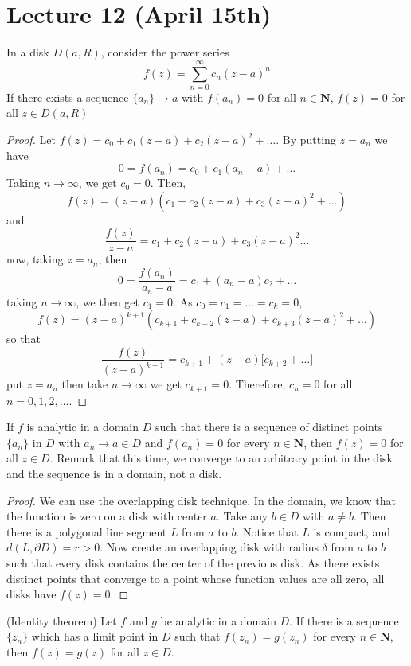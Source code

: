 \section{Lecture 12 (April 15th)}
\begin{thm}
In a disk $D(a,R)$, consider the power series 
\[f(z)=\sum ^{\infty }_{n=0}c_{n}(z-a)^{n}\]
If there exists a sequence $\{a_{n}\}\rightarrow a$ with $f(a_{n})=0$ for all $n\in {\bm N}$, $f(z)=0$ for all $z\in D(a,R)$
\end{thm}
\vspace{2ex}
\begin{proof}
Let $f(z)=c_0+c_1(z-a)+c_2(z-a)^2+\ldots $. By putting $z=a_{n}$ we have
\[0=f(a_{n})=c_0+c_1(a_{n}-a)+\ldots \]
Taking $n\rightarrow \infty $, we get $c_0=0$. Then,
\[f(z)=(z-a)(c_1+c_2(z-a)+c_3(z-a)^2+\ldots )\]
and
\[\dfrac{f(z)}{z-a}=c_1+c_2(z-a)+c_3(z-a)^2\ldots \]
now, taking $z=a_{n}$, then
\[0=\dfrac{f(a_{n})}{a_{n}-a}=c_1+(a_{n}-a)c_2+\ldots \]
taking $n\rightarrow  \infty $, we then get $c_1=0$. As $c_0=c_1=\ldots =c_{k}=0$,
\[f(z)=(z-a)^{k+1}(c_{k+1}+c_{k+2}(z-a)+c_{k+3}(z-a)^2+\ldots )\]
so that
\[\dfrac{f(z)}{(z-a)^{k+1}}=c_{k+1}+(z-a)\Big[c_{k+2}+\ldots \Big]\]
put $z=a_{n}$ then take $n\rightarrow \infty $ we get $c_{k+1}=0$. Therefore, $c_{n}=0$ for all $n=0,1,2,\ldots $.
\end{proof}
\vspace{2ex}
\begin{thm}
If $f$ is analytic in a domain $D$ such that there is a sequence of distinct points $\{a_{n}\}$ in $D$ with $a_{n}\rightarrow a\in D$ and $f(a_{n})=0$ for every $n\in {\bm N}$, then $f(z)=0$ for all $z\in D$. Remark that this time, we converge to an arbitrary point in the disk and the sequence is in a domain, not a disk.
\end{thm}
\vspace{2ex}
\begin{proof}
We can use the overlapping disk technique. In the domain, we know that the function is zero on a disk with center $a$. Take any $b\in D$ with $a\ne b$. Then there is a polygonal line segment $L$ from $a$ to $b$. Notice that $L$ is compact, and $d(L,\partial D)=r>0$. Now create an overlapping disk with radius $\delta $ from $a$ to $b$ such that every disk contains the center of the previous disk. As there exists distinct points that converge to a point whose function values are all zero, all disks have $f(z)=0$. 
\end{proof}
\vspace{2ex}
\begin{defi}
(Identity theorem) Let $f$ and $g$ be analytic in a domain $D$. If there is a sequence $\{z_{n}\}$ which has a limit point in $D$ such that $f(z_{n})=g(z_{n})$ for every $n\in {\bm N}$, then $f(z)=g(z)$ for all $z\in D$.
\end{defi}
